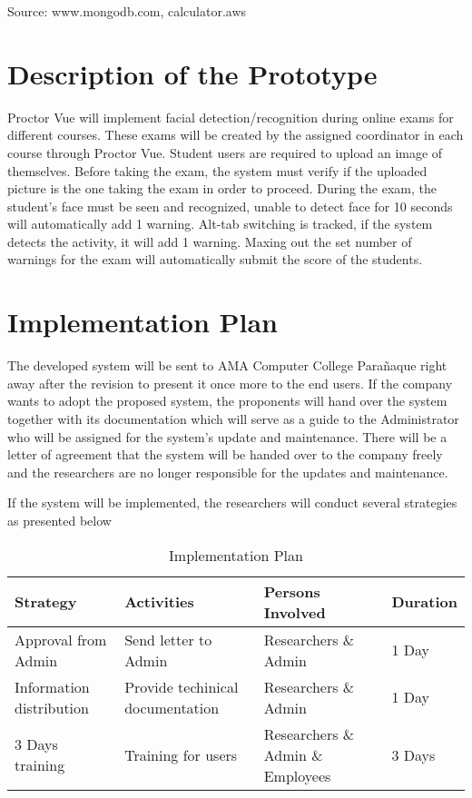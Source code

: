 Source: www.mongodb.com, calculator.aws

\section{Description of the Prototype}

Proctor Vue will implement facial detection/recognition during online exams for different courses.
These exams will be created by the assigned coordinator in each course through Proctor Vue.
Student users are required to upload an image of themselves.
Before taking the exam, the system must verify if the uploaded picture is the one taking the exam in order to proceed.
During the exam, the student's face must be seen and recognized, unable to detect face for 10 seconds will automatically add 1 warning.
Alt-tab switching is tracked, if the system detects the activity, it will add 1 warning.
Maxing out the set number of warnings for the exam will automatically submit the score of the students.

\section{Implementation Plan}

The developed system will be sent to AMA Computer College Parañaque right away after the revision to present it once more to the end users.
If the company wants to adopt the proposed system, the proponents will hand over the system together with its documentation which will serve as a guide to the Administrator who will be assigned for the system’s update and maintenance.
There will be a letter of agreement that the system will be handed over to the company freely and the researchers are no longer responsible for the updates and maintenance.

If the system will be implemented, the researchers will conduct several strategies as presented below

\vspace{1cm}

\begin{table}[h!]
   \begin{center}
      \begin{tabular}{|m{10em}|m{8em}|m{10em}|m{4em}|}
         \hline
         \textbf{Strategy}        & \textbf{Activities}              & \textbf{Persons Involved}         & \textbf{Duration} \\
         \hline
         Approval from Admin      & Send letter to Admin             & Researchers \& Admin              & 1 Day             \\
         \hline
         Information distribution & Provide techinical documentation & Researchers \& Admin              & 1 Day             \\
         \hline
         3 Days training          & Training for users               & Researchers \& Admin \& Employees & 3 Days            \\
         \hline
      \end{tabular}
   \end{center}

   \caption{Implementation Plan}
\end{table}

